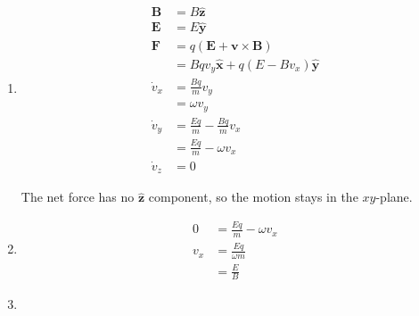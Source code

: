 \documentclass{article}
\renewcommand{\vec}[1]{\boldsymbol{\mathbf{#1}}}
\newcommand{\uvec}[1]{\hat{\vec{#1}}}
\begin{document}
\begin{enumerate}
  \item

        \begin{align*}
          \vec{B}   & = B \uvec{z}                                \\
          \vec{E}   & = E \uvec{y}                                \\
          \vec{F}   & = q (\vec{E} + \vec{v} \times \vec{B})      \\
                    & = B q v_y \uvec{x} + q (E - B v_x) \uvec{y} \\
          \dot{v}_x & = \frac{B q}{m} v_y                         \\
                    & = \omega v_y                                \\
          \dot{v}_y & = \frac{E q}{m} - \frac{B q}{m} v_x         \\
                    & = \frac{E q}{m} - \omega v_x                \\
          \dot{v}_z & = 0
        \end{align*}

        The net force has no $\uvec{z}$ component, so the motion stays in the $xy$-plane.

  \item

        \begin{align*}
          0   & = \frac{E q}{m} - \omega v_x \\
          v_x & = \frac{E q}{\omega m}       \\
              & = \frac{E}{B}
        \end{align*}

  \item


\end{enumerate}
\end{document}
